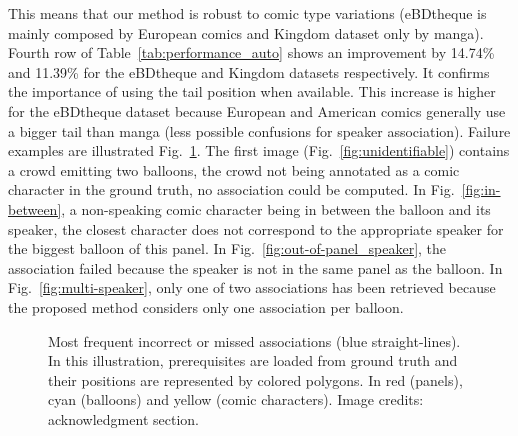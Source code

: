 \documentclass[conference]{IEEEtran}
\begin{document}
This means that our method is robust to comic type variations (eBDtheque is mainly composed by European comics and Kingdom dataset only by manga).
Fourth row of Table~\ref{tab:performance_auto} shows an improvement by 14.74\% and 11.39\% for the eBDtheque and Kingdom datasets respectively.
It confirms the importance of using the tail position when available.
This increase is higher for the eBDtheque dataset because European and American comics generally use a bigger tail than manga (less possible confusions for speaker association).
Failure examples are illustrated Fig.~\ref{fig:failure_case_from_gt}.
The first image (Fig.~\ref{fig:unidentifiable}) contains a crowd emitting two balloons, the crowd not being annotated as a comic character in the ground truth, no association could be computed.
In Fig.~\ref{fig:in-between}, a non-speaking comic character being in between the balloon and its speaker, the closest character does not correspond to the appropriate speaker for the biggest balloon of this panel.
In Fig.~\ref{fig:out-of-panel_speaker}, the association failed because the speaker is not in the same panel as the balloon.
In Fig.~\ref{fig:multi-speaker}, only one of two associations has been retrieved because the proposed method considers only one association per balloon.

\begin{figure}[t] %
  \centering
    \hspace{0.2em}
    \vspace{1em}
    \hspace{0.2em}
    \caption{Most frequent incorrect or missed associations (blue straight-lines). In this illustration, prerequisites are loaded from ground truth and their positions are represented by colored polygons. In red (panels), cyan (balloons) and yellow (comic characters). Image credits: acknowledgment section.}
  \label{fig:failure_case_from_gt}
\end{figure}
\end{document}
